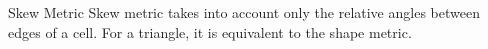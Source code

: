\documentclass[t,12pt]{beamer}
\begin{document}
\begin{frame}{Skew Metric}
Skew metric takes into account only the relative angles between edges of a cell. For a triangle, it is equivalent to the shape metric.
\begin{figure}
	\centering
	\hspace{0.2in}
	\subfloat{
}
\end{figure}
\end{frame}
\end{document}
